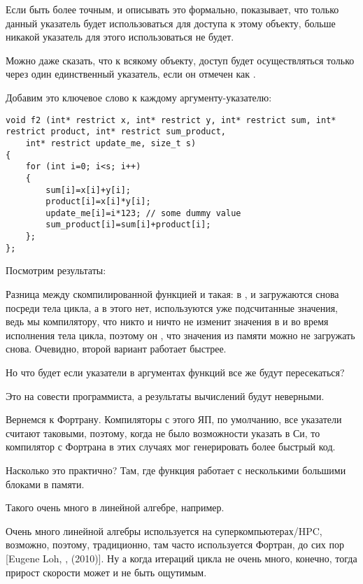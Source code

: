 Если быть более точным, и описывать это формально,  показывает, что только данный указатель будет
использоваться для доступа к этому объекту, больше никакой указатель для
этого использоваться не будет.

Можно даже сказать, что к всякому объекту, доступ будет осуществляться только через
один единственный указатель, если он отмечен как .

Добавим это ключевое слово к каждому аргументу-указателю:

\begin{lstlisting}
void f2 (int* restrict x, int* restrict y, int* restrict sum, int* restrict product, int* restrict sum_product, 
	int* restrict update_me, size_t s)
{
	for (int i=0; i<s; i++)
	{
		sum[i]=x[i]+y[i];
		product[i]=x[i]*y[i];
		update_me[i]=i*123; // some dummy value
		sum_product[i]=sum[i]+product[i];	
	};
};
\end{lstlisting}

Посмотрим результаты:





Разница между скомпилированной функцией  и  такая:
в ,  и  загружаются снова посреди тела цикла,
а в  этого нет, используются уже подсчитанные значения, 
ведь мы  компилятору, 
что никто и ничто не изменит значения в  
и  во время исполнения тела цикла, 
поэтому он , что значения из памяти можно не загружать снова.
Очевидно, второй вариант работает быстрее.

Но что будет если указатели в аргументах функций все же будут пересекаться?

Это на совести программиста, а результаты вычислений будут неверными.

Вернемся к Фортрану. 
Компиляторы с этого ЯП, по умолчанию, все указатели считают таковыми,
поэтому, когда не было возможности указать  в Си, 
то компилятор с Фортрана в этих случаях мог генерировать более быстрый код.

Насколько это практично? 
Там, где функция работает с несколькими большими блоками в памяти.

Такого очень много в линейной алгебре, например.

Очень много линейной алгебры используется на суперкомпьютерах/\ac{HPC},
возможно, поэтому, традиционно, там часто используется Фортран, до сих пор
[Eugene Loh, , (2010)].
Ну а когда итераций цикла не очень много, конечно, 
тогда прирост скорости может и не быть ощутимым.

